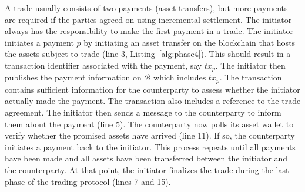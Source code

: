 A trade usually consists of two payments (asset transfers), but more payments are required if the parties agreed on using incremental settlement.
The initiator always has the responsibility to make the first payment in a trade.
The initiator initiates a payment $ p $ by initiating an asset transfer on the blockchain that hosts the assets subject to trade (line 3, Listing~\ref{alg:phase4}).
This should result in a transaction identifier associated with the payment, say $ tx_p $.
The initiator then publishes the payment information on $ \mathcal{B} $ which includes $ tx_p $.
The \TRPayment{} transaction contains sufficient information for the counterparty to assess whether the initiator actually made the payment.
The transaction also includes a reference to the trade agreement.
The initiator then sends a \MsgPayment{} message to the counterparty to inform them about the payment (line 5).
The counterparty now polls its asset wallet to verify whether the promised assets have arrived (line 11).
If so, the counterparty initiates a payment back to the initiator.
This process repeats until all payments have been made and all assets have been transferred between the initiator and the counterparty.
At that point, the initiator finalizes the trade during the last phase of the trading protocol (lines 7 and 15).



